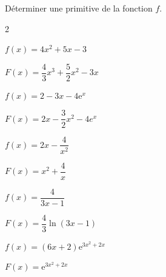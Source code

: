 \documentclass[11pt,a4paper]{article}  %
\begin{document}
	\graphicspath{{images/}}
	
	\begin{center}
		
	\end{center}
%	
	
\vspace*{-0.5cm}
Déterminer une primitive de la fonction $f$.

\begin{multicols}{2}
	\begin{enumMet}
		\item {} $f(x)=4 x^2+5 x-3$
		\begin{corrBox}
			$F(x)=\dfrac{4}{3}x^3+\dfrac{5}{2}x^2-3x$		
		\end{corrBox}
		\item $f(x)=2-3x-4 \mathrm{e}^x$
		\begin{corrBox}
			$F(x)=2x-\dfrac{3}{2}x^2-4e^x$		
		\end{corrBox}
		\item $f(x)=2 x-\dfrac{4}{x^2}$
		\begin{corrBox}
			$F(x)=x^2+\dfrac{4}{x}$		
		\end{corrBox}
		\item $f(x)=\dfrac{4}{3 x-1}$
		\begin{corrBox}
			$F(x)=\dfrac{4}{3}\ln(3x-1)$		
		\end{corrBox}
		\item $f(x)=(6x+2) \mathrm{e}^{3x^2+2 x}$
		\begin{corrBox}
			$F(x)=\mathrm{e}^{3x^2+2 x}$		
		\end{corrBox}
	\end{enumMet}
\end{multicols}
\end{document}
